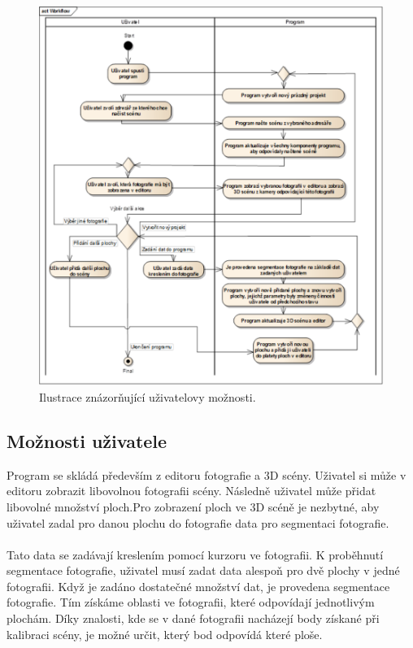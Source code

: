 \documentclass[11pt,twoside,a4paper]{book}
\begin{document}
\clearpage

\begin{figure}[t]
	\begin{center}
		\includegraphics[width=14cm]{ilustrace/Workflow}
		\caption{Ilustrace znázorňující uživatelovy možnosti.}
		\label{fig:workflow}
	\end{center}
\end{figure}

\clearpage



\subsection{Možnosti uživatele}
Program se skládá především z editoru fotografie a 3D scény. Uživatel si může v editoru zobrazit libovolnou fotografii scény. Následně uživatel může přidat libovolné množství ploch.Pro zobrazení ploch ve 3D scéně je nezbytné, aby uživatel zadal pro danou plochu do fotografie data pro segmentaci fotografie. 
\paragraph{}
Tato data se zadávají kreslením pomocí kurzoru ve fotografii. K proběhnutí segmentace fotografie, uživatel musí zadat data alespoň pro dvě plochy v jedné fotografii. Když je zadáno dostatečné množství dat, je provedena segmentace fotografie. Tím získáme oblasti ve fotografii, které odpovídají jednotlivým plochám. Díky znalosti, kde se v dané fotografii nacházejí body získané při kalibraci scény, je možné určit, který bod odpovídá které ploše.
\end{document}
